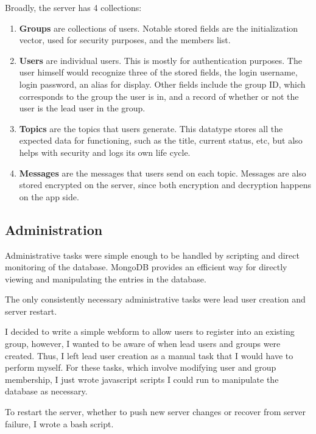       Broadly, the server has 4 collections:
      \begin{enumerate}
      \item \textbf{Groups} are collections of users.
        Notable stored fields are the initialization vector, used for security purposes,
        and the members list.
      \item \textbf{Users} are individual users.
        This is mostly for authentication purposes.
        The user himself would recognize three of the stored fields,
        the login username, login password, an alias for display.
        Other fields include the group ID, which corresponds to the group the user is in,
        and a record of whether or not the user is the lead user in the group.
      \item \textbf{Topics} are the topics that users generate.
        This datatype stores all the expected data for functioning,
        such as the title, current status, etc,
        but also helps with security and logs its own life cycle.
      \item \textbf{Messages} are the messages that users send on each topic.
        Messages are also stored encrypted on the server,
        since both encryption and decryption happens on the app side.
      \end{enumerate}

    \subsection{Administration}
      Administrative tasks were simple enough to be handled by scripting
      and direct monitoring of the database.
      MongoDB provides an efficient way for directly viewing
      and manipulating the entries in the database.

      The only consistently necessary administrative tasks were lead user creation
      and server restart.

      I decided to write a simple webform to allow users to register
      into an existing group,
      however, I wanted to be aware of when lead users and groups were created.
      Thus, I left lead user creation as a manual task that I would have to
      perform myself.
      For these tasks, which involve modifying user and group membership,
      I just wrote javascript scripts I could run to manipulate the database
      as necessary.

      To restart the server,
      whether to push new server changes or recover from server failure,
      I wrote a bash script.

